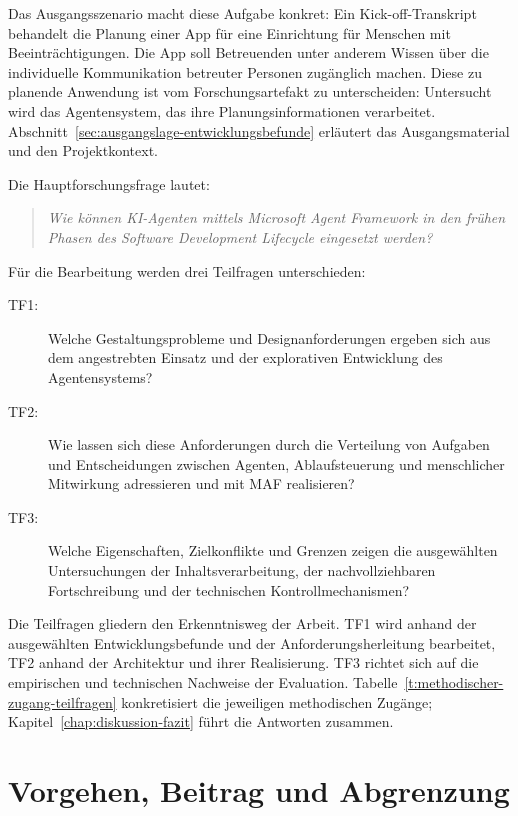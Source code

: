 Das Ausgangsszenario macht diese Aufgabe konkret: Ein
Kick-off-Transkript behandelt die Planung einer App für eine
Einrichtung für Menschen mit Beeinträchtigungen. Die App soll
Betreuenden unter anderem Wissen über die individuelle Kommunikation
betreuter Personen zugänglich machen. Diese zu planende Anwendung ist
vom Forschungsartefakt zu unterscheiden: Untersucht wird das
Agentensystem, das ihre Planungsinformationen verarbeitet.
Abschnitt~\ref{sec:ausgangslage-entwicklungsbefunde} erläutert das
Ausgangsmaterial und den Projektkontext.

Die Hauptforschungsfrage lautet:
\begin{quote}
\emph{Wie können KI-Agenten mittels Microsoft Agent Framework in den
frühen Phasen des Software Development Lifecycle eingesetzt werden?}
\end{quote}

Für die Bearbeitung werden drei Teilfragen unterschieden:
\begin{description}
  \item[TF1:] Welche Gestaltungsprobleme und Designanforderungen ergeben
  sich aus dem angestrebten Einsatz und der explorativen Entwicklung
  des Agentensystems?
  \item[TF2:] Wie lassen sich diese Anforderungen durch die Verteilung
  von Aufgaben und Entscheidungen zwischen Agenten, Ablaufsteuerung
  und menschlicher Mitwirkung adressieren und mit MAF realisieren?
  \item[TF3:] Welche Eigenschaften, Zielkonflikte und Grenzen zeigen
  die ausgewählten Untersuchungen der Inhaltsverarbeitung, der
  nachvollziehbaren Fortschreibung und der technischen
  Kontrollmechanismen?
\end{description}

Die Teilfragen gliedern den Erkenntnisweg der Arbeit. TF1 wird anhand
der ausgewählten Entwicklungsbefunde und der Anforderungsherleitung
bearbeitet, TF2 anhand der Architektur und ihrer Realisierung.
TF3 richtet sich auf die empirischen und technischen Nachweise der
Evaluation. Tabelle~\ref{t:methodischer-zugang-teilfragen} konkretisiert
die jeweiligen methodischen Zugänge;
Kapitel~\ref{chap:diskussion-fazit} führt die Antworten zusammen.

\section{Vorgehen, Beitrag und Abgrenzung}
\label{sec:einleitung-vorgehen-beitrag}

